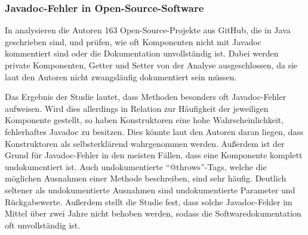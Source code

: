 \subsubsection{Javadoc-Fehler in Open-Source-Software}
In \cite[S.~249ff.]{JavadocViolationsandTheirEvolutioninOpen-SourceSoftware} analysieren die Autoren 163 Open-Source-Projekte aus GitHub, die in Java geschrieben sind, und prüfen, wie oft Komponenten nicht mit Javadoc kommentiert sind oder die Dokumentation unvollständig ist. Dabei werden private Komponenten, Getter und Setter von der Analyse ausgeschlossen, da sie laut den Autoren nicht zwangsläufig dokumentiert sein müssen. 

Das Ergebnis der Studie lautet, dass Methoden besonders oft Javadoc-Fehler aufweisen. Wird dies allerdings in Relation zur Häufigkeit der jeweiligen Komponente gestellt, so haben Konstruktoren eine hohe Wahrscheinlichkeit, fehlerhaftes Javadoc zu besitzen. Dies könnte laut den Autoren daran liegen, dass Konstruktoren als selbsterklärend wahrgenommen werden. Außerdem ist der Grund für Javadoc-Fehler in den meisten Fällen, dass eine Komponente komplett undokumentiert ist. Auch undokumentierte \enquote{@throws}-Tags, welche die möglichen Ausnahmen einer Methode beschreiben, sind sehr häufig. Deutlich seltener als undokumentierte Ausnahmen sind undokumentierte Parameter und Rückgabewerte. Außerdem stellt die Studie fest, dass solche Javadoc-Fehler im Mittel über zwei Jahre nicht behoben werden, sodass die Softwaredokumentation oft unvollständig ist. 

